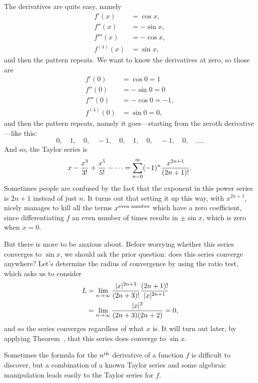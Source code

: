 \begin{solution}
The derivatives are quite easy, namely
\begin{align*}
  f'(x)&=\cos x,\\
  f''(x)&=-\sin x,\\
  f'''(x)&=-\cos x,\\
  f^{(4)}(x)&=\sin x,
\end{align*}
and then the pattern repeats. We want to know the derivatives at zero, so those are
\begin{align*}
  f'( 0)&=\cos  0 = 1\\
  f''( 0)&=-\sin  0 = 0 \\
  f'''( 0)&=-\cos  0 = -1,\\
  f^{(4)}( 0)&=\sin 0 = 0,
\end{align*}
and then the pattern repeats, namely it goes---starting from the zeroth derivative---like this:
$$
0,\quad  1,\quad  0,\quad  -1,\quad  0,\quad  1,\quad  0,\quad  -1,\quad  0,\quad \ldots.
$$
And so, the Taylor series is
$$
  x-{x^3\over 3!}+{x^5\over 5!}-\cdots=
  \sum_{n=0}^\infty (-1)^n{x^{2n+1}\over (2n+1)!}.
$$
Sometimes people are confused by the fact that the exponent in this
power series is $2n+1$ instead of just $n$.  It turns out that setting
it up this way, with $x^{2n+1}$, nicely manages to kill all the terms
$x^{\mbox{\scriptsize even number}}$ which have a zero coefficient,
since differentiating $f$ an even number of times results in $\pm \sin
x$, which is zero when $x = 0$.

But there is more to be anxious about.  Before worrying whether this
series converges to $\sin x$, we should ask the prior question: does
this series converge anywhere?  Let's determine the radius of
convergence by using the ratio test, which asks us to consider
\begin{align*}
  L &= \lim_{n\to\infty} {|x|^{2n+3}\over (2n+3)!}{(2n+1)!\over |x|^{2n+1}} \\
    &=\lim_{n\to\infty} {|x|^2\over (2n+3)(2n+2)}=0,
\end{align*}
and so the series converges regardless of what $x$ is.  It will turn
out later, by applying Theorem~, that
this series does converge to $\sin x$.
\end{solution}


Sometimes the formula for the $n^{\mbox{\scriptsize th}}$ derivative of a function $f$
is difficult to discover, but a combination of a known Taylor series
and some algebraic manipulation leads easily to the Taylor series for
$f$.

